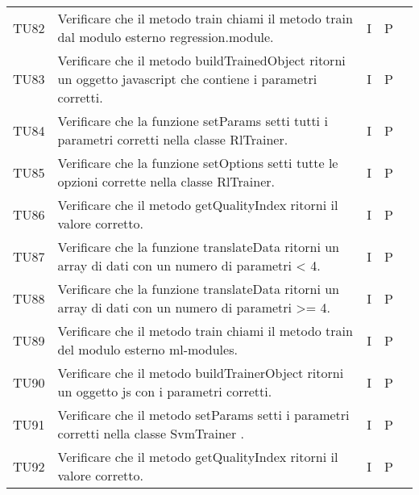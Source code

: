 \begin{longtable} {
		>{}p{15mm} 
		>{}p{79.5mm}
		>{}p{15mm} 
		>{}p{15mm}
		>{}p{0mm}}
	TU82		& Verificare che il metodo train chiami il metodo train dal modulo esterno regression.module.& I & P &\TBstrut \\ [2mm]
	TU83		& Verificare che il metodo buildTrainedObject ritorni un oggetto javascript che contiene i parametri corretti.& I & P &\TBstrut \\ [2mm]
	TU84		& Verificare che la funzione setParams setti tutti i parametri corretti nella classe RlTrainer.& I & P &\TBstrut \\ [2mm]
	TU85		& Verificare che la funzione setOptions setti tutte le opzioni corrette nella classe RlTrainer.& I & P &\TBstrut \\ [2mm]
	TU86		& Verificare che il metodo getQualityIndex ritorni il valore corretto. & I & P &\TBstrut \\ [2mm]
	TU87		& Verificare che la funzione translateData ritorni un array di dati con un numero di parametri < 4.& I & P &\TBstrut \\ [2mm]
	TU88		& Verificare che la funzione translateData ritorni un array di dati con un numero di parametri >= 4.& I & P &\TBstrut \\ [2mm]
	TU89		& Verificare che il metodo train chiami il metodo train del modulo esterno ml-modules.& I & P &\TBstrut \\ [2mm]
	TU90		& Verificare che il metodo buildTrainerObject ritorni un oggetto js con i parametri corretti.& I & P &\TBstrut \\ [2mm]
	TU91		& Verificare che il metodo setParams setti i parametri corretti nella classe SvmTrainer .& I & P &\TBstrut \\ [2mm]
	TU92		& Verificare che il metodo getQualityIndex ritorni il valore corretto.& I & P &\TBstrut \\ [2mm]
	


\end{longtable}
